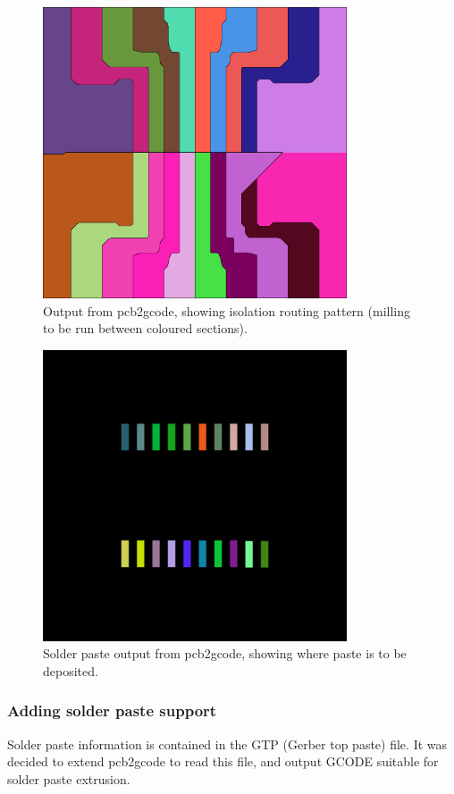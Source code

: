 \begin{figure}[ht!]
\centering
\includegraphics[width=90mm]{resources/breakout_isolation.png}
\caption{Output from pcb2gcode, showing isolation routing pattern (milling to be run between coloured sections).}
\label{pcb2gcodeisolation}
\end{figure}

\begin{figure}[ht!]
\centering
\includegraphics[width=90mm]{resources/breakout_paste.png}
\caption{Solder paste output from pcb2gcode, showing where paste is to be deposited.}
\label{pcb2gcodepaste}
\end{figure}

\subsubsection{Adding solder paste support}
Solder paste information is contained in the GTP (Gerber top paste) file. It was decided to extend pcb2gcode to read this file, and output GCODE suitable for solder paste extrusion.

